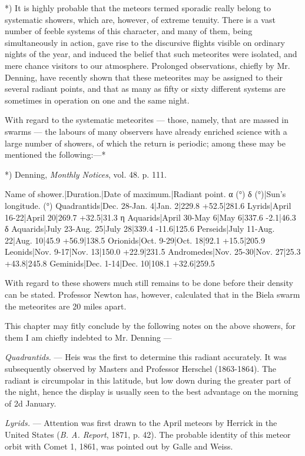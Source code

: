 \documentclass[a4paper, 12pt, oneside, polutonikogreek, english]{article}
\begin{document}
*) It is highly probable that the meteors termed sporadic really belong to systematic showers, which are, however, of extreme tenuity. There is a vast number of feeble systems of this character, and many of them, being simultaneously in action, gave rise to the discursive flights visible on ordinary nights of the year, and induced the belief that such meteorites were isolated, and mere chance visitors to our atmosphere. Prolonged observations, chiefly by Mr. Denning, have recently shown that these meteorites may be assigned to their several radiant points, and that as many as fifty or sixty different systems are sometimes in operation on one and the same night.

With regard to the systematic meteorites --- those, namely, that are massed in swarms --- the labours of many observers have already enriched science with a large number of showers, of which the return is periodic; among these may be mentioned the following:---*

*) Denning, \emph{Monthly Notices}, vol. 48. p. 111.

Name of shower.|Duration.|Date of maximum.|Radiant point. α (°) δ (°)|Sun's longitude. (°) 
Quadrantids|Dec. 28-Jan. 4|Jan. 2|229.8 +52.5|281.6 
Lyrids|April 16-22|April 20|269.7 +32.5|31.3 
η Aquarids|April 30-May 6|May 6|337.6 -2.1|46.3 
δ Aquarids|July 23-Aug. 25|July 28|339.4 -11.6|125.6 
Perseids|July 11-Aug. 22|Aug. 10|45.9 +56.9|138.5 
Orionids|Oct. 9-29|Oct. 18|92.1 +15.5|205.9 
Leonids|Nov. 9-17|Nov. 13|150.0 +22.9|231.5 
Andromedes|Nov. 25-30|Nov. 27|25.3 +43.8|245.8 
Geminids|Dec. 1-14|Dec. 10|108.1 +32.6|259.5

With regard to these showers much still remains to be done before their density can be stated. Professor Newton has, however, calculated that in the Biela swarm the meteorites are 20 miles apart.

This chapter may fitly conclude by the following notes on the above showers, for them I am chiefly indebted to Mr. Denning ---

\emph{Quadrantids.} --- Heis was the first to determine this radiant accurately. It was subsequently observed by Masters and Professor Herschel (1863-1864). The radiant is circumpolar in this latitude, but low down during the greater part of the night, hence the display is usually seen to the best advantage on the morning of 2d January.

\emph{Lyrids.} --- Attention was first drawn to the April meteors by Herrick in the United States (\emph{B. A. Report}, 1871, p. 42). The probable identity of this meteor orbit with Comet 1, 1861, was pointed out by Galle and Weiss.
\end{document}
